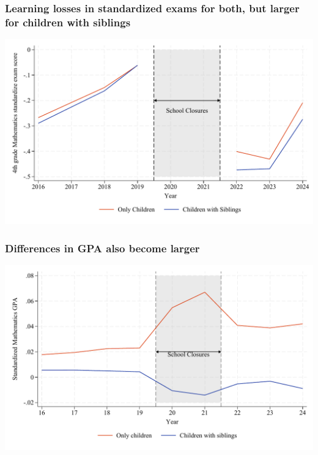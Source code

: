 \documentclass{beamer}
\begin{document}
\begin{frame}[T]
\end{frame}

\begin{frame}
    \label{frame:ece_trends}
    \frametitle{Learning losses in standardized exams for both, but larger for children with siblings}
               \includegraphics[width=\textwidth]{./FIGURES/Descriptive/raw_ece_math_4.pdf}    
    
\end{frame}

\begin{frame}
    \label{frame:gpa_trends}
    \frametitle{Differences in GPA also become larger}
               \includegraphics[width=\textwidth]{./FIGURES/Descriptive/raw_shade_total_elm_std_gpa_m_adj_Tsiblings_Sall_Size2_4.pdf}    
            \hyperlink{frame:gpa_trends_grades_elm}{}
  
\end{frame}
\end{document}
